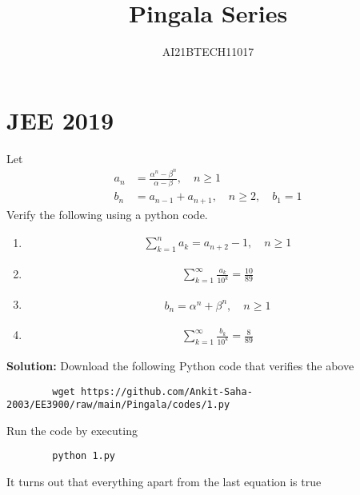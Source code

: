 \documentclass[journal,12pt,twocolumn]{IEEEtran}
\title{Pingala Series}
\author{\normalsize AI21BTECH11017 \\ \vspace*{20pt} \normalsize}
\newcommand{\solution}{\noindent \textbf{Solution: }}
\numberwithin{equation}{section}
\renewcommand\thesection{\arabic{section}}
\begin{document}
\maketitle

\section{JEE 2019}
Let 
\begin{align}
	a_n &= \frac{\alpha^{n}-\beta^{n}}{\alpha - \beta}, \quad n \ge 1
	\\
	b_n &= a_{n-1} + a_{n+1}, \quad n \ge 2, \quad b_1 =1
	\label{eq:10-orig-diff}
\end{align}
Verify the following using a python code.
\begin{enumerate}[label=\thesection.\arabic*,ref=\thesection.\theenumi]
\item 
\begin{align}
	\sum_{k=1}^{n}a_k = a_{n+2}-1, \quad n \ge 1
\end{align}
 \item 
\begin{align}
	\sum_{k=1}^{\infty}\frac{a_k}{10^k} =\frac{10}{89}
\end{align}
 \item 
\begin{align}
	b_n =\alpha^n + \beta^n, \quad n \ge 1
\end{align}
 \item 
\begin{align}
	\sum_{k=1}^{\infty}\frac{b_k}{10^k} =\frac{8}{89}
\end{align}
\end{enumerate}
\solution Download the following Python code that verifies the above
	\begin{lstlisting}
		wget https://github.com/Ankit-Saha-2003/EE3900/raw/main/Pingala/codes/1.py
	\end{lstlisting}
	
	Run the code by executing
	\begin{lstlisting}
		python 1.py
	\end{lstlisting}
	
	It turns out that everything apart from the last equation is true
\end{document}
